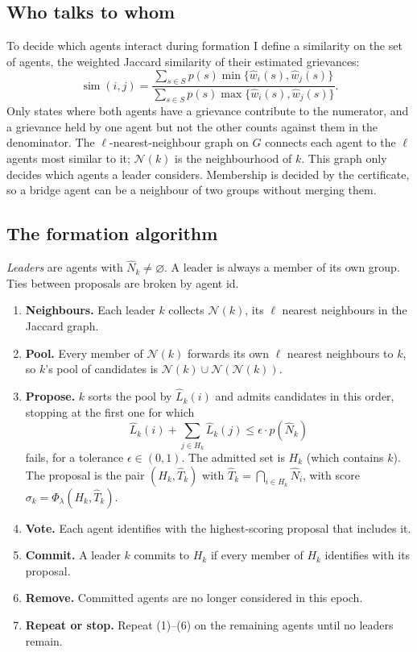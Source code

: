 \documentclass[11pt]{article}
\newcommand{\nb}{\mathcal{N}}   %
\theoremstyle{plain}
\theoremstyle{definition}
\theoremstyle{remark}
\begin{document}
\subsection{Who talks to whom}
To decide which agents interact during formation I define a similarity on the set of agents, the weighted Jaccard similarity of their estimated grievances:
\[ \operatorname{sim}(i, j) = \frac{\sum_{s \in S}p(s)\min\{ \hat{w}_i(s), \hat{w}_j(s) \}}{\sum_{s \in S}p(s)\max \{ \hat{w}_i(s), \hat{w}_j(s) \}}. \]
Only states where both agents have a grievance contribute to the numerator, and a grievance held by one agent but not the other counts against them in the denominator.
The $\ell$-nearest-neighbour graph on $G$ connects each agent to the $\ell$ agents most similar to it; $\nb(k)$ is the neighbourhood of $k$. This graph only decides which agents a leader considers.
Membership is decided by the certificate, so a bridge agent can be a neighbour of two groups without merging them.
 
\subsection{The formation algorithm}
\emph{Leaders} are agents with $\hat N_k\neq\varnothing$. A leader is always a member of its own group. Ties between proposals are broken by agent id.
 
\begin{tcolorbox}[colback=gray!5,colframe=gray!60,title={\textbf{Algorithm: one formation epoch}},fonttitle=\small,left=4pt,right=4pt]
\begin{enumerate}[label=(\arabic*),leftmargin=2.2em,itemsep=3pt]
    \item \textbf{Neighbours.} Each leader $k$ collects $\nb(k)$, its $\ell$ nearest neighbours in the Jaccard graph.
    \item \textbf{Pool.} Every member of $\nb(k)$ forwards its own $\ell$ nearest neighbours to $k$, so $k$'s pool of candidates is $\nb(k)\cup\nb(\nb(k))$.
    \item \textbf{Propose.} $k$ sorts the pool by $\hat L_k(i)$ and admits candidates in this order, stopping at the first one for which
    \[ \hat{L}_k(i) + \sum_{j \in H_k}\hat{L}_k(j) \leq \epsilon\cdot p(\hat N_k) \]
    fails, for a tolerance $\epsilon\in(0,1)$. The admitted set is $H_k$ (which contains $k$). The proposal is the pair $(H_k,\hat T_k)$ with
    $\hat T_k=\bigcap_{i\in H_k}\hat N_i$, with score $\sigma_k=\Phi_\lambda(H_k,\hat T_k)$.
    \item \textbf{Vote.} Each agent identifies with the highest-scoring proposal that includes it.
    \item \textbf{Commit.} A leader $k$ commits to $H_k$ if every member of $H_k$ identifies with its proposal.
    \item \textbf{Remove.} Committed agents are no longer considered in this epoch.
    \item \textbf{Repeat or stop.} Repeat (1)--(6) on the remaining agents until no leaders remain.
\end{enumerate}
\end{tcolorbox}
 
\end{document}
